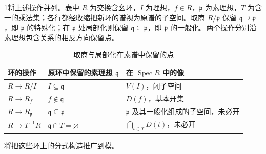 \ProseParagraphBreak
\cref{b3:tab:spectrum-operations}将上述操作并列。表中 \(R\) 为交换含幺环，\(I\) 为理想，\(f\in R\)，\(\mathfrak p\) 为素理想，\(T\) 为含一的乘法集；各行都经收缩把新环的谱视为原谱的子空间。取商 \(R/\mathfrak p\) 保留 \(\mathfrak q\supseteq\mathfrak p\)，即 \(\mathfrak p\) 的特殊化；在 \(\mathfrak p\) 处局部化则保留 \(\mathfrak q\subseteq\mathfrak p\)，即 \(\mathfrak p\) 的一般化。两个操作分别沿素理想包含关系的相反方向保留点。

\begin{table}[htbp]
	\centering
	\caption{取商与局部化在素谱中保留的点}
	\label{b3:tab:spectrum-operations}
	\begin{tabularx}{\textwidth}{@{}l>{\raggedright\arraybackslash}p{}>{\raggedright\arraybackslash}X@{}}
		\toprule
		环的操作 & 原环中保留的素理想 \(\mathfrak q\) & 在 \(\operatorname{Spec}R\) 中的像 \\
		\midrule
		\(R\rightarrow R/I\) & \(I\subseteq\mathfrak q\) & \(V(I)\)，闭子空间 \\
		\(R\rightarrow R_f\) & \(f\notin\mathfrak q\) & \(D(f)\)，基本开集 \\
		\(R\rightarrow R_{\mathfrak p}\) & \(\mathfrak q\subseteq\mathfrak p\) & \(\mathfrak p\) 及其一般化组成的子空间，未必开 \\
		\(R\rightarrow T^{-1}R\) & \(\mathfrak q\cap T=\varnothing\) & \(\bigcap_{t\in T}D(t)\)，未必开 \\
		\bottomrule
	\end{tabularx}
\end{table}

将把这些环上的分式构造推广到模。
